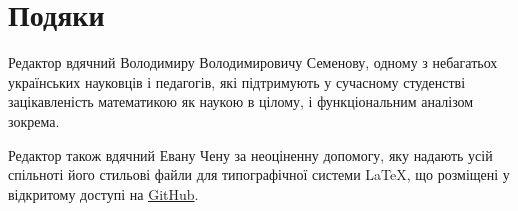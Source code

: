 \section*{Подяки}

Редактор вдячний Володимиру Володимировичу Семенову,
одному з небагатьох українських науковців і педагогів,
які підтримують у сучасному студенстві
зацікавленість математикою як наукою в цілому,
і функціональним аналізом зокрема.

Редактор також вдячний Евану Чену за неоціненну допомогу,
яку надають усій спільноті його стильові файли
для типографічної системи \LaTeX,
що розміщені у відкритому доступі на \href{https://github.com/vEnhance/dotfiles/blob/master/texmf/tex/latex/evan/evan.sty}{GitHub}.